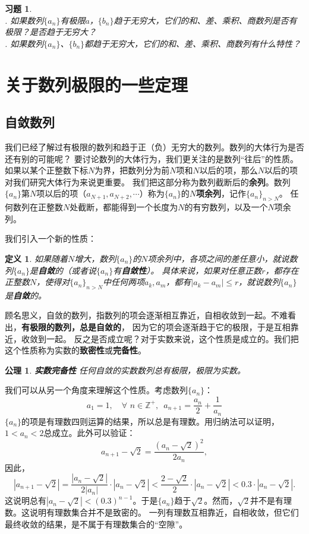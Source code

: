 \documentclass[12pt,UTF8]{ctexbook}
\newtheorem{df}{定义}[section]
\newtheorem*{po}{公理}
\newtheorem{xt}{习题}[section]
\begin{document}
\begin{xt}
    \mbox{} \\
    . 如果数列$\{a_n\}$有极限$a$，$\{b_n\}$趋于无穷大，它们的和、差、乘积、商数列是否有极限？是否趋于无穷大？\\
    . 如果数列$\{a_n\}$、$\{b_n\}$都趋于无穷大，它们的和、差、乘积、商数列有什么特性？
\end{xt}

\section{关于数列极限的一些定理}
\subsection{自敛数列}

我们已经了解过有极限的数列和趋于正（负）无穷大的数列。数列的大体行为是否还有别的可能呢？
要讨论数列的大体行为，我们更关注的是数列“往后”的性质。如果以某个正整数下标$N$为界，把数列分为前$N$项和$N$以后的项，那么$N$以后的项对我们研究大体行为来说更重要。
我们把这部分称为数列截断后的\textbf{余列}。数列$\{a_n\}$第$N$项以后的项（$a_{N+1}, a_{N+2}, \cdots$）称为$\{a_n\}$的$N$\textbf{项余列}，记作$\{a_n\}_{n>N}$。
任何数列在正整数$N$处截断，都能得到一个长度为$N$的有穷数列，以及一个$N$项余列。

我们引入一个新的性质：
\begin{df}
    如果随着$N$增大，数列$\{a_n\}$的$N$项余列中，各项之间的差任意小，就说数列$\{a_n\}$是\textbf{自敛}的（或者说$\{a_n\}$有\textbf{自敛性}）。
    具体来说，如果对任意正数$r$，都存在正整数$N$，使得对$\{a_n\}_{n>N}$中任何两项$a_k, a_m$，都有$|a_k - a_m| \leqslant r$，就说数列$\{a_n\}$是\textbf{自敛}的。
\end{df}
顾名思义，自敛的数列，指数列的项会逐渐相互靠近，自相收敛到一起。不难看出，\textbf{有极限的数列，总是自敛的}，
因为它的项会逐渐趋于它的极限，于是互相靠近，收敛到一起。
反之是否成立呢？对于实数来说，这个性质是成立的。我们把这个性质称为实数的\textbf{致密性}或\textbf{完备性}。

\begin{po}\textbf{实数完备性}
    任何自敛的实数数列总有极限，极限为实数。
\end{po}

我们可以从另一个角度来理解这个性质。考虑数列$\{a_n\}$：
$$ a_1 = 1, \quad \forall \,\, n \in \mathbb{Z}^+, \,\,\, a_{n+1} = \frac{a_n}{2} + \frac{1}{a_n} $$
$\{a_n\}$的项是有理数四则运算的结果，所以总是有理数。用归纳法可以证明，$1 < a_n < 2$总成立。此外可以验证：
$$ a_{n+1} - \sqrt{2} = \frac{(a_n - \sqrt{2})^2}{2a_n},$$
因此，
$$ |a_{n+1} - \sqrt{2}| = \frac{|a_n - \sqrt{2}|}{2|a_n|} \cdot |a_n - \sqrt{2}| < \frac{2 - \sqrt{2}}{2} \cdot |a_n - \sqrt{2}| < 0.3\cdot |a_n - \sqrt{2}|. $$
这说明总有$|a_n - \sqrt{2}| < (0.3)^{n-1}$。于是$\{a_n\}$趋于$\sqrt{2}$。然而，$\sqrt{2}$并不是有理数。这说明有理数集合并不是致密的。
一列有理数互相靠近，自相收敛，但它们最终收敛的结果，是不属于有理数集合的“空隙”。
\end{document}
